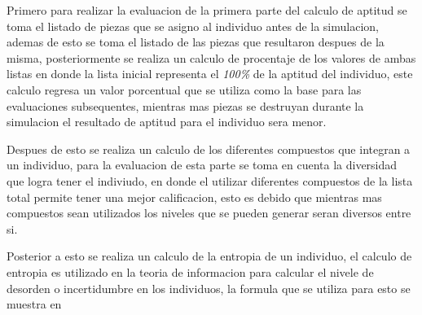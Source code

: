 Primero para realizar la evaluacion de la primera parte del calculo de aptitud
se toma el listado de piezas que se asigno al individuo antes de la simulacion,
ademas de esto se toma el listado de las piezas que resultaron despues de la
misma, posteriormente se realiza un calculo de procentaje de los valores de
ambas listas en donde la lista inicial representa el \textit{100\%} de la
aptitud del individuo, este calculo regresa un valor porcentual que se utiliza
como la base para las evaluaciones subsequentes, mientras mas piezas se
destruyan durante la simulacion el resultado de aptitud para el individuo sera
menor.

Despues de esto se realiza un calculo de los diferentes compuestos que integran
a un individuo, para la evaluacion de esta parte se toma en cuenta la diversidad
que logra tener el indiviudo, en donde el utilizar diferentes compuestos de la
lista total permite tener una mejor calificacion, esto es debido que mientras
mas compuestos sean utilizados los niveles que se pueden generar seran diversos
entre si.

Posterior a esto se realiza un calculo de la entropia de un individuo, el
calculo de entropia es utilizado en la teoria de informacion para calcular el
nivele de desorden o incertidumbre en los individuos, la formula que se utiliza
para esto se muestra en 


